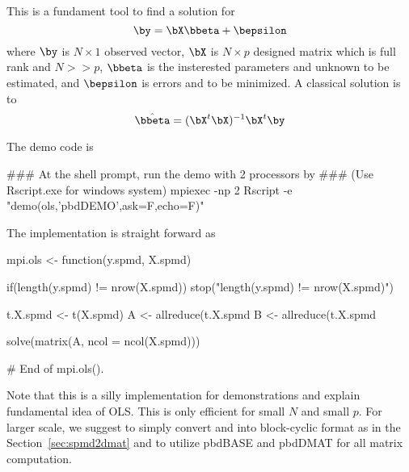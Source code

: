This is a fundament tool to find a solution for
$$\by = \bX\bbeta + \bepsilon$$
where $\by$ is $N\times 1$ observed vector,
$\bX$ is $N\times p$ designed matrix which is full rank and $N >> p$,
$\bbeta$ is the insterested parameters and unknown to be estimated,
and $\bepsilon$ is errors and to be minimized.
A classical solution is to
$$
\hat{\bbeta} = (\bX^t\bX)^{-1}\bX^t\by
$$

The demo code is
\begin{Command}
### At the shell prompt, run the demo with 2 processors by
### (Use Rscript.exe for windows system)
mpiexec -np 2 Rscript -e "demo(ols,'pbdDEMO',ask=F,echo=F)"
\end{Command}

The implementation is straight forward as
\begin{Code}[title=R Code]
mpi.ols <- function(y.spmd, X.spmd){
  if(length(y.spmd) != nrow(X.spmd)){
    stop("length(y.spmd) != nrow(X.spmd)")
  }

  t.X.spmd <- t(X.spmd)
  A <- allreduce(t.X.spmd %
  B <- allreduce(t.X.spmd %

  solve(matrix(A, ncol = ncol(X.spmd))) %
} # End of mpi.ols().

\end{Code}
Note that this is a silly implementation for demonstrations and
explain fundamental idea of OLS.
This is only efficient for small $N$ and small $p$. For larger scale,
we suggest to simply convert  and  into
block-cyclic format as in the Section~\ref{sec:spmd2dmat} and
to utilize pbdBASE and pbdDMAT for all matrix computation.

